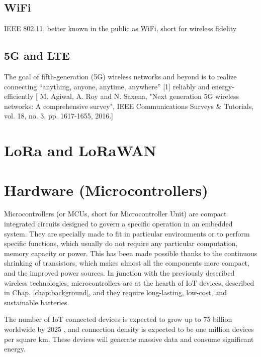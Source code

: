	\subsection{WiFi}

	IEEE 802.11, better known in the public as WiFi, short for wireless fidelity
	
	\subsection{5G and LTE}
	
	The goal of fifth-generation (5G) wireless networks and beyond is to realize connecting “anything, anyone, anytime, anywhere” [1] reliably and energy-efficiently [ M. Agiwal, A. Roy and N. Saxena, "Next generation 5G wireless networks: A comprehensive survey", IEEE Communications Surveys \& Tutorials, vol. 18, no. 3, pp. 1617-1655, 2016.]
	

\section{LoRa and LoRaWAN}

\newpage
	
\section{Hardware (Microcontrollers)}\label{sec:microcontrollers}

	Microcontrollers (or MCUs, short for Microcontroller Unit) are compact integrated circuits designed to govern a specific operation in an embedded system.
	They are specially made to fit in particular environments or to perform specific functions, which usually do not require any particular computation, memory capacity or power.
	This has been made possible thanks to the continuous shrinking of transistors, which makes almost all the components more compact, and the improved power sources.
	In junction with the previously described wireless technologies, microcontrollers are at the hearth of IoT devices, described in Chap. \ref{chap:background}, and they require long-lasting, low-cost, and sustainable batteries.
	
	The number of IoT connected devices is expected to grow up to 75 billion worldwide by 2025 \cite{statista}, and connection density is expected to be one million devices per square km\cite{noma}.
	These devices will generate massive data and consume significant energy.
	
